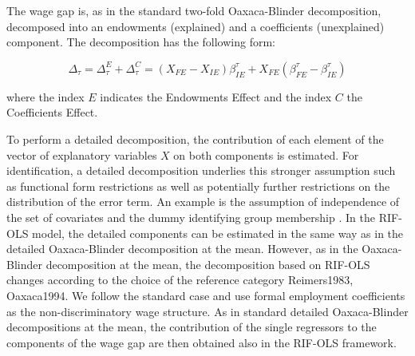 The wage gap is, as in the standard two-fold Oaxaca-Blinder decomposition, decomposed into an endowments (explained) and a coefficients (unexplained) component. The decomposition has the following form:

\begin{linenomath*}
	\begin{equation}
		\Delta_\tau = \Delta_\tau^E + \Delta_\tau^C = (X_{FE}- X_{IE})\beta_{IE}^\tau + X_{FE}(\beta_{FE}^\tau - \beta_{IE}^\tau)
	\end{equation}
\end{linenomath*}

where the index \( E \) indicates the Endowments Effect and the index \( C \) the Coefficients Effect.

To perform a detailed decomposition, the contribution of each element of the vector of explanatory variables \( X \) on both components is estimated. For identification, a detailed decomposition underlies this stronger assumption such as functional form restrictions as well as potentially further restrictions on the distribution of the error term. An example is the assumption of independence of the set of covariates and the dummy identifying group membership \parencite{Fortin2011}. In the RIF-OLS model, the detailed components can be estimated in the same way as in the detailed Oaxaca-Blinder decomposition at the mean. However, as in the Oaxaca-Blinder decomposition at the mean, the decomposition based on RIF-OLS changes according to the choice of the reference category Reimers1983, Oaxaca1994. We follow the standard case and use formal employment coefficients as the non-discriminatory wage structure. As in standard detailed Oaxaca-Blinder decompositions at the mean, the contribution of the single regressors to the components of the wage gap are then obtained also in the RIF-OLS framework.

